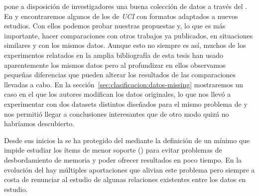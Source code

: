 \citet{Lichman-UCI-2013} pone a disposición de investigadores una buena colección de datos a través del . En  y  encontraremos algunos de los \datasets de \emph{UCI} con formatos adaptados a nuevos estudios. Con ellos podemos probar nuestras propuestas y, lo que es más importante, hacer comparaciones con otros trabajos ya publicados, en situaciones similares y con los mismos datos. Aunque esto no siempre es así, muchos de los experimentos relatados en la amplia bibliografía de esta tesis han usado aparentemente los mismos datos pero al profundizar en ellos observamos pequeñas diferencias que pueden alterar los resultados de las comparaciones llevadas a cabo. En la sección~\ref{sec:clasificacion:datos-missing} mostraremos un caso en el que los autores modifican los datos originales, lo que nos llevó a experimentar con dos datasets distintos diseñados para el mismo problema de \clasificacion y nos permitió llegar a conclusiones interesantes que de otro modo quizá no habríamos descubierto.







Desde sus inicios la \ARM se ha protegido del \dilemaIR mediante la definición de un \soporte mínimo que impide estudiar los ítems de menor soporte (\irs) para evitar problemas de desbordamiento de memoria y poder ofrecer resultados en poco tiempo. En la evolución del \ARM hay múltiples aportaciones que alivian este problema pero siempre a costa de renunciar al estudio de algunas relaciones existentes entre los datos en estudio.

